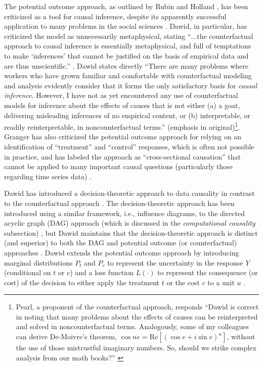 \documentclass{article}[10pt]
\begin{document}
The potential outcome approach, as outlined by Rubin and Holland \cite{Rubin1974,Holland1986}, has been criticized as a tool for causal inference, despite its apparently successful application to many problems in the social sciences \cite{Morgan2014,Imbens2015}.  Dawid, in particular, has criticized the model as unnecessarily metaphysical, stating ``$\ldots$the counterfactual approach to causal inference is essentially metaphysical, and full of temptations to make `inferences' that cannot be justified on the basis of empirical data and are thus unscientific.'' \cite{Dawid2000}.  Dawid states directly  ``There are many problems where workers who have grown familiar and comfortable with counterfactual modeling and analysis evidently consider that it forms the only satisfactory basis for {\em causal inference}. However, I have not as yet encountered any use of counterfactual models for inference about the effects of causes that is not either (a) a goat, delivering misleading inferences of no empirical content, or (b) interpretable, or readily reinterpretable, in noncounterfactual terms.'' \cite{Dawid2000} (emphasis in original)\footnote{Pearl, a proponent of the counterfactual approach, responds ``Dawid is correct in noting that many problems about the effects of causes can be reinterpreted and solved in noncounterfactual terms. Analogously, some of my colleagues can derive De-Moivre's theorem, $\cos ne = \mathrm{Re}[(\cos e +i \sin e)^n]$, without the use of those mistrustful imaginary numbers. So, should we strike complex analysis from our math books?'' \cite{Pearl2000c}}.  Granger has also criticized the potential outcome approach for relying on an identification of ``treatment'' and ``control'' responses, which is often not possible in practice, and has labeled the approach as ``cross-sectional causation'' that cannot be applied to many important causal questions (particularly those regarding time series data) \cite{Granger1986}.

Dawid has introduced a decision-theoretic approach to data causality in contrast to the counterfactual approach \cite{Dawid2002,Dawid2000}.  The decision-theoretic approach has been introduced using a similar framework, i.e., influence diagrams, to the directed acyclic graph (DAG) approach (which is discussed in the {\em computational causality} subsection) \cite{Dawid2002}, but Dawid maintains that the decision-theoretic approach is distinct (and superior) to both the DAG and potential outcome (or counterfactual) approaches \cite{Dawid2007,Dawid2010}.  Dawid extends the potential outcome approach by introducing marginal distributions $P_t$ and $P_c$ to represent the uncertainty in the response $Y$ (conditional on $t$ or $c$) and a loss function $L(\cdot)$ to represent the consequence (or cost) of the decision to either apply the treatment $t$ or the cost $c$ to a unit $u$ \cite{Dawid2000,Illari2011Dawid}.
\end{document}
